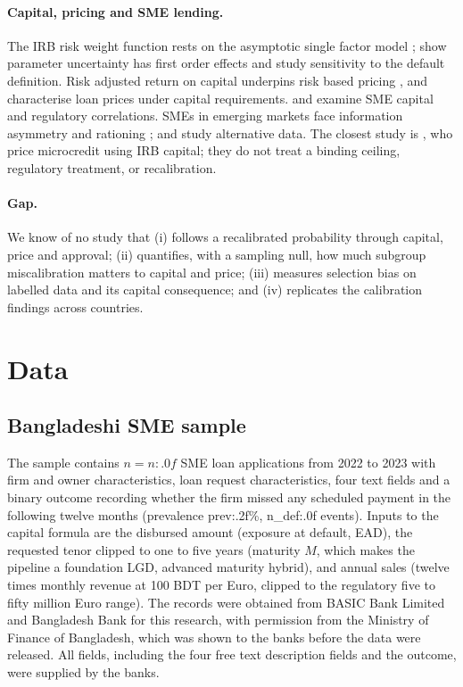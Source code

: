 \documentclass[11pt,a4paper]{article}
\begin{document}
\paragraph{Capital, pricing and SME lending.} The IRB risk weight function rests on the asymptotic single factor model \citep{Vasicek2002,Gordy2003}; \citet{Tarashev2010} show parameter uncertainty has first order effects and \citet{Witzany2008} study sensitivity to the default definition. Risk adjusted return on capital underpins risk based pricing \citep{Froot1998,Stoughton2007,Saunders2010}, and \citet{Repullo2004} characterise loan prices under capital requirements. \citet{Altman2005} and \citet{Vozzella2020} examine SME capital and regulatory correlations. SMEs in emerging markets face information asymmetry and rationing \citep{Beck2006,Berger2006,Petersen1994,StiglitzWeiss1981}; \citet{Bjorkegren2020} and \citet{Berg2020} study alternative data. The closest study is \citet{Durango2024}, who price microcredit using IRB capital; they do not treat a binding ceiling, regulatory treatment, or recalibration.

\paragraph{Gap.} We know of no study that (i) follows a recalibrated probability through capital, price and approval; (ii) quantifies, with a sampling null, how much subgroup miscalibration matters to capital and price; (iii) measures selection bias on labelled data and its capital consequence; and (iv) replicates the calibration findings across countries.

\section{Data}\label{sec:data}
\subsection{Bangladeshi SME sample}
The sample contains $n={{n:.0f}}$ SME loan applications from 2022 to 2023 with firm and owner characteristics, loan request characteristics, four text fields and a binary outcome recording whether the firm missed any scheduled payment in the following twelve months (prevalence {{prev:.2f}}\%, {{n_def:.0f}} events). Inputs to the capital formula are the disbursed amount (exposure at default, EAD), the requested tenor clipped to one to five years (maturity $M$, which makes the pipeline a foundation LGD, advanced maturity hybrid), and annual sales (twelve times monthly revenue at 100 BDT per Euro, clipped to the regulatory five to fifty million Euro range). The records were obtained from BASIC Bank Limited and Bangladesh Bank for this research, with permission from the Ministry of Finance of Bangladesh, which was shown to the banks before the data were released. All fields, including the four free text description fields and the outcome, were supplied by the banks.
\end{document}

